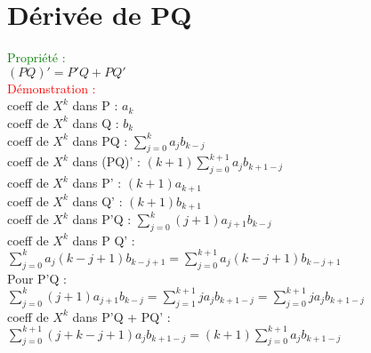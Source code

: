 \documentclass{article}
\begin{document}
\section{Dérivée de PQ}
\textcolor{green}{Propriété :} \\
$(PQ)'=P'Q + PQ'$ \\
\textcolor{red}{Démonstration : } \\
coeff de $X^k$ dans P : $a_k$ \\
coeff de $X^k$ dans Q : $b_k$ \\
coeff de $X^k$ dans PQ : $\sum_{j=0}^k a_j b_{k-j}$ \\
coeff de $X^k$ dans (PQ)' : $(k+1) \sum_{j=0}^{k+1} a_j b_{k+1-j}$ \\
coeff de $X^k$ dans P' : $(k+1) a_{k+1}$ \\
coeff de $X^k$ dans Q' : $(k+1) b_{k+1}$ \\
coeff de $X^k$ dans P'Q : $\sum_{j=0}^k (j+1)a_{j+1} b_{k-j} $ \\
coeff de $X^k$ dans P Q' : $\sum_{j=0}^{k} a_j(k-j+1)b_{k-j+1}=\sum_{j=0}^{k+1} a_j(k-j+1)b_{k-j+1}$ \\
Pour P'Q : \\
$\sum_{j=0}^k(j+1)a_{j+1}b_{k-j}=\sum_{j=1}^{k+1}j a_j b_{k+1-j}=\sum_{j=0}^{k+1}j a_j b_{k+1-j}$ \\
coeff de $X^k$ dans P'Q + PQ' : $\sum_{j=0}^{k+1}(j+k-j+1)a_j b_{k+1-j}=(k+1)\sum_{j=0}^{k+1}a_j b_{k+1-j}$
\end{document}
